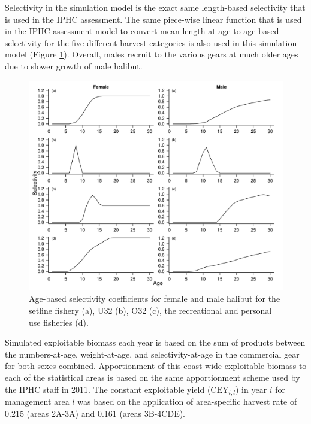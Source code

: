 Selectivity in the simulation model is the exact same length-based selectivity that is used in the IPHC assessment.  The same piece-wise linear function that is used in the IPHC assessment model to convert mean length-at-age to age-based selectivity for the five different harvest categories is also used in this simulation model (Figure \ref{fig:FIGURES_fig:AgeSel}).  Overall, males recruit to the various gears at much older ages due to slower growth of male halibut.
\begin{figure}[htbp]
	\centering
		\includegraphics[width=\textwidth]{../FIGURES/fig:AgeSel.pdf}
	\caption{Age-based selectivity coefficients for female and male halibut for the setline fishery (a), U32 (b), O32 (c), the recreational and personal use fisheries (d).}
	\label{fig:FIGURES_fig:AgeSel}
\end{figure}

Simulated exploitable biomass each year is based on the sum of products between the numbers-at-age,  weight-at-age, and selectivity-at-age in the commercial gear for both sexes combined.  Apportionment of this coast-wide exploitable biomass to each of the statistical areas is based on the same apportionment scheme used by the IPHC staff in 2011.  The constant exploitable yield ($\mathrm{CEY}_{i,l}$) in year $i$ for  management area $l$ was based on the application of area-specific harvest rate of 0.215 (areas 2A-3A) and 0.161 (areas 3B-4CDE).
